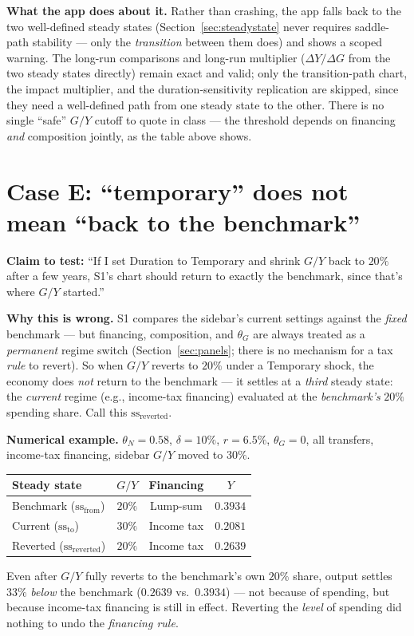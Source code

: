 \documentclass[11pt]{article}
\begin{document}
\begin{notebox}
\textbf{What the app does about it.} Rather than crashing, the app falls
back to the two well-defined steady states (Section~\ref{sec:steadystate}
never requires saddle-path stability --- only the \emph{transition}
between them does) and shows a scoped warning. The long-run comparisons
and long-run multiplier ($\Delta Y/\Delta G$ from the two steady states
directly) remain exact and valid; only the transition-path chart, the
impact multiplier, and the duration-sensitivity replication are skipped,
since they need a well-defined path from one steady state to the other.
There is no single ``safe'' $G/Y$ cutoff to quote in class --- the
threshold depends on financing \emph{and} composition jointly, as the
table above shows.
\end{notebox}

\section{Case E: ``temporary'' does not mean ``back to the benchmark''}
\label{sec:caseE}

\textbf{Claim to test:} ``If I set Duration to Temporary and shrink $G/Y$
back to $20\%$ after a few years, S1's chart should return to
exactly the benchmark, since that's where $G/Y$ started.''

\textbf{Why this is wrong.} S1 compares the sidebar's current
settings against the \emph{fixed} benchmark --- but financing, composition, and $\theta_G$ are always
treated as a \emph{permanent} regime switch (Section~\ref{sec:panels};
there is no mechanism for a tax \emph{rule} to revert). So when $G/Y$
reverts to $20\%$ under a Temporary shock, the economy does \emph{not}
return to the benchmark --- it settles at a \emph{third} steady state:
the \emph{current} regime (e.g., income-tax financing) evaluated at the
\emph{benchmark's} $20\%$ spending share. Call this $\text{ss}_{\text{reverted}}$.

\begin{casebox}
\textbf{Numerical example.} $\theta_N=0.58$, $\delta=10\%$, $r=6.5\%$,
$\theta_G=0$, all transfers, income-tax financing, sidebar $G/Y$ moved to
$30\%$.
\begin{center}
\begin{tabular}{lccc}
\toprule
Steady state & $G/Y$ & Financing & $Y$ \\
\midrule
Benchmark ($\text{ss}_{\text{from}}$) & $20\%$ & Lump-sum & $0.3934$ \\
Current ($\text{ss}_{\text{to}}$) & $30\%$ & Income tax & $0.2081$ \\
Reverted ($\text{ss}_{\text{reverted}}$) & $20\%$ & Income tax & $0.2639$ \\
\bottomrule
\end{tabular}
\end{center}
Even after $G/Y$ fully reverts to the benchmark's own $20\%$ share,
output settles $33\%$ \emph{below} the benchmark ($0.2639$ vs.\ $0.3934$)
--- not because of spending, but because income-tax financing is still in
effect. Reverting the \emph{level} of spending did nothing to undo the
\emph{financing rule}.
\end{casebox}
\end{document}
